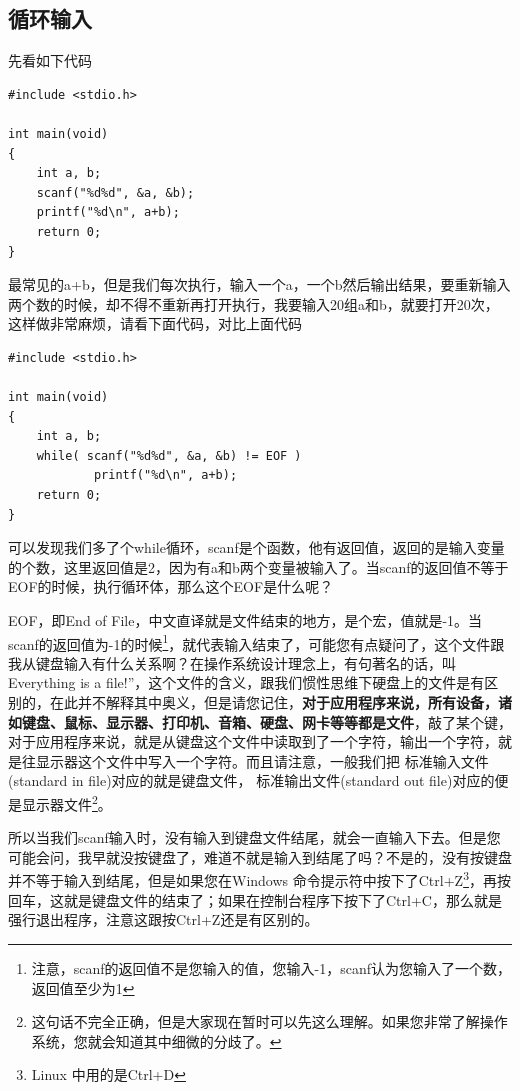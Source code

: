 \documentclass[11pt,twoside,a4paper,titlepage]{article}	%
\newcommand{\kw}[1]{\textcolor[rgb]{0.0,0.0,0.63}{ #1}}
\begin{document}
\subsection{循环输入}
先看如下代码

\begin{lstlisting}
#include <stdio.h>

int main(void)
{
	int a, b;
	scanf("%d%d", &a, &b);
	printf("%d\n", a+b);
	return 0;
}
\end{lstlisting}

最常见的a+b，但是我们每次执行，输入一个a，一个b然后输出结果，要重新输入两个数的时候，却不得不重新再打开执行，我要输入20组a和b，就要打开20次，这样做非常麻烦，请看下面代码，对比上面代码

\begin{lstlisting}
#include <stdio.h>

int main(void)
{
	int a, b;
	while( scanf("%d%d", &a, &b) != EOF )
			printf("%d\n", a+b);
	return 0;
}
\end{lstlisting}

可以发现我们多了个while循环，scanf是个函数，他有返回值，返回的是输入变量的个数，这里返回值是2，因为有a和b两个变量被输入了。当scanf的返回值不等于EOF的时候，执行循环体，那么这个EOF是什么呢？

EOF，即End of File，中文直译就是文件结束的地方，是个宏，值就是-1。当scanf的返回值为-1的时候\footnote{注意，scanf的返回值不是您输入的值，您输入-1，scanf认为您输入了一个数，返回值至少为1}，就代表输入结束了，可能您有点疑问了，这个文件跟我从键盘输入有什么关系啊？在操作系统设计理念上，有句著名的话，叫 Everything is a file!”，这个文件的含义，跟我们惯性思维下硬盘上的文件是有区别的，在此并不解释其中奥义，但是请您记住，\textbf{对于应用程序来说，所有设备，诸如键盘、鼠标、显示器、打印机、音箱、硬盘、网卡等等都是文件}，敲了某个键，对于应用程序来说，就是从键盘这个文件中读取到了一个字符，输出一个字符，就是往显示器这个文件中写入一个字符。而且请注意，一般我们把\kw{标准输入文件(standard in file)}对应的就是键盘文件，\kw{标准输出文件(standard out file)}对应的便是显示器文件\footnote{这句话不完全正确，但是大家现在暂时可以先这么理解。如果您非常了解操作系统，您就会知道其中细微的分歧了。}。

所以当我们scanf输入时，没有输入到键盘文件结尾，就会一直输入下去。但是您可能会问，我早就没按键盘了，难道不就是输入到结尾了吗？不是的，没有按键盘并不等于输入到结尾，但是如果您在Windows 命令提示符中按下了Ctrl+Z\footnote{Linux 中用的是Ctrl+D}，再按回车，这就是键盘文件的结束了；如果在控制台程序下按下了Ctrl+C，那么就是强行退出程序，注意这跟按Ctrl+Z还是有区别的。
\end{document}
